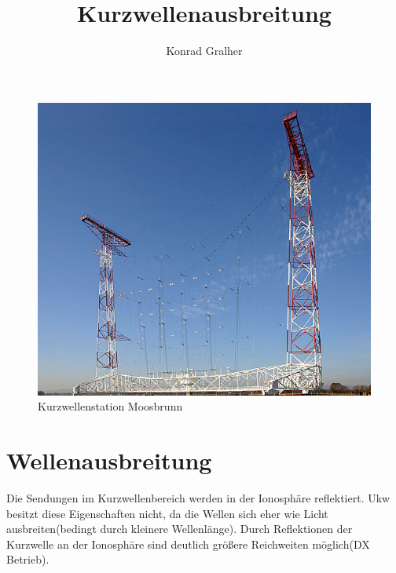 \documentclass[fontzize=12pt,paper=a4,twoside=false]{article}
\title{Kurzwellenausbreitung}
\author{Konrad Gralher}
\begin{document}
\begin{titlepage}
    \bfseries\Huge{}    
    \begin{figure}
        \includegraphics[]{assets/640px-Moosbrunn_SW_Antenna}
        \caption{Kurzwellenstation Moosbrunn}  
    \end{figure}        
\end{titlepage}

\part[]{Wellenausbreitung}

    Die Sendungen im Kurzwellenbereich werden in der Ionosphäre reflektiert. 
    Ukw besitzt diese Eigenschaften nicht, da die Wellen sich eher wie Licht ausbreiten(bedingt durch kleinere Wellenlänge). Durch Reflektionen der Kurzwelle an der Ionosphäre
    sind deutlich größere Reichweiten möglich(DX Betrieb).
    \vspace{0.1cm}
\end{document}
